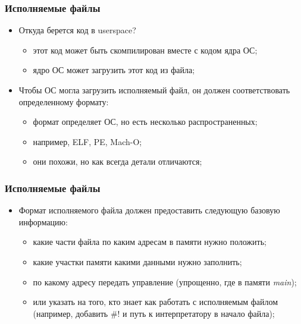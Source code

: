 \begin{frame}
\frametitle{Исполняемые файлы}
\begin{itemize}
  \item<1-> Откуда берется код в userspace?
    \begin{itemize}
      \item этот код может быть скомпилирован вместе с кодом ядра ОС;
      \item ядро ОС может загрузить этот код из файла;
    \end{itemize}
  \item<2-> Чтобы ОС могла загрузить исполняемый файл, он должен соответствовать определенному формату:
    \begin{itemize}
      \item формат определяет ОС, но есть несколько распространенных;
      \item например, ELF, PE, Mach-O;
      \item они похожи, но как всегда детали отличаются;
    \end{itemize}
\end{itemize}
\end{frame}

\begin{frame}
\frametitle{Исполняемые файлы}
\begin{itemize}
  \item Формат исполняемого файла должен предоставить следующую базовую информацию:
    \begin{itemize}
      \item какие части файла по каким адресам в памяти нужно положить;
      \item какие участки памяти какими данными нужно заполнить;
      \item по какому адресу передать управление (упрощенно, где в памяти \emph{main});
      \item или указать на того, кто знает как работать с исполняемым файлом (например, добавить \#! и путь к интерпретатору в начало файла);
    \end{itemize}
\end{itemize}
\end{frame}

